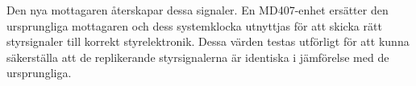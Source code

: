 \documentclass[a4paper]{article}
\begin{document}
\vspace{5mm} \noindent
Den nya mottagaren återskapar dessa signaler. En MD407-enhet ersätter den ursprungliga mottagaren och dess systemklocka utnyttjas för att skicka rätt styrsignaler till korrekt styrelektronik. Dessa värden testas utförligt för att kunna säkerställa att de replikerande styrsignalerna är identiska i jämförelse med de ursprungliga.









%

\end{document}
